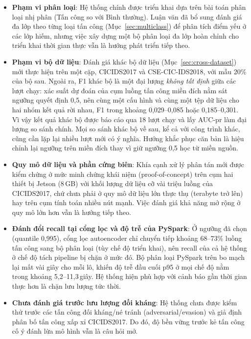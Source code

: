 \begin{itemize}
    \item \textbf{Phạm vi phân loại}: Hệ thống chính được triển khai dựa trên bài toán phân loại nhị phân (Tấn công so với Bình thường). Luận văn đã bổ sung đánh giá đa lớp theo từng loại tấn công (Mục~\ref{sec:multiclass}) để phân tích điểm yếu ở các lớp hiếm, nhưng việc xây dựng một bộ phân loại đa lớp hoàn chỉnh cho triển khai thời gian thực vẫn là hướng phát triển tiếp theo.
    \item \textbf{Phạm vi bộ dữ liệu}: Đánh giá khác bộ dữ liệu (Mục~\ref{sec:cross-dataset}) mới thực hiện trên một cặp, CICIDS2017 và CSE-CIC-IDS2018, với mẫu 20\% của bộ sau. Ngoài ra, F1 khác bộ là một đại lượng \emph{không tất định} giữa các lượt chạy: xác suất dự đoán của cụm luồng tấn công miền đích nằm sát ngưỡng quyết định 0{,}5, nên cùng một cấu hình và cùng một tệp dữ liệu cho hai nhóm kết quả rời nhau, F1 trong khoảng 0{,}029--0{,}085 hoặc 0{,}185--0{,}301. Vì vậy kết quả khác bộ được báo cáo qua 18 lượt chạy và lấy AUC-\ac{pr} làm đại lượng so sánh chính. Mọi so sánh khác bộ về sau, kể cả với công trình khác, cũng cần lặp lại nhiều lượt mới có ý nghĩa. Hướng khắc phục căn bản là hiệu chỉnh lại ngưỡng trên miền đích thay vì giữ ngưỡng 0{,}5 học từ miền nguồn.
    \item \textbf{Quy mô dữ liệu và phần cứng biên}: Khía cạnh xử lý phân tán mới được kiểm chứng ở mức minh chứng khái niệm (proof-of-concept) trên cụm hai thiết bị Jetson (8\,GB) với khối lượng dữ liệu cỡ vài triệu luồng của CICIDS2017, chứ chưa phải ở quy mô dữ liệu lớn thực thụ (terabyte trở lên) hay trên cụm tính toán nhiều nút mạnh. Việc đánh giá khả năng mở rộng ở quy mô lớn hơn vẫn là hướng tiếp theo.
    \item \textbf{Đánh đổi recall tại cổng lọc và độ trễ của PySpark}: Ở ngưỡng đã chọn (quantile 0{,}995), cổng lọc autoencoder chỉ chuyển tiếp khoảng 68--73\% luồng tấn công sang bộ phân loại (tùy chế độ triển khai), nên recall của cả hệ thống ở chế độ tách pipeline bị chặn ở mức đó. Bộ phân loại PySpark trên bo mạch lại mất vài giây cho mỗi lô, khiến độ trễ đầu cuối p95 ở mọi chế độ nằm trong khoảng 5{,}2--11{,}3\,giây. Hệ thống hiện phù hợp với cảnh báo gần thời gian thực hơn là chặn lưu lượng tức thời.
    \item \textbf{Chưa đánh giá trước lưu lượng đối kháng}: Hệ thống chưa được kiểm thử trước các tấn công đối kháng/né tránh (adversarial/evasion) và giả định phân bố tấn công xấp xỉ CICIDS2017. Do đó, độ bền vững trước kẻ tấn công cố ý đánh lừa mô hình vẫn là câu hỏi mở.
\end{itemize}

